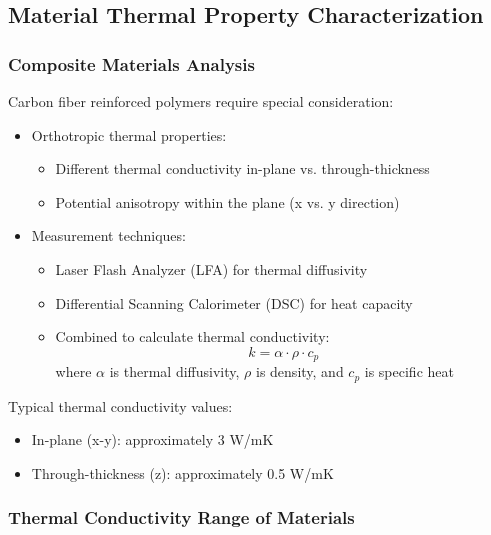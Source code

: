 \subsection*{Material Thermal Property Characterization}

\subsubsection*{Composite Materials Analysis}

Carbon fiber reinforced polymers require special consideration:
\begin{itemize}
    \item Orthotropic thermal properties:
    \begin{itemize}
        \item Different thermal conductivity in-plane vs. through-thickness
        \item Potential anisotropy within the plane (x vs. y direction)
    \end{itemize}
    \item Measurement techniques:
    \begin{itemize}
        \item Laser Flash Analyzer (LFA) for thermal diffusivity
        \item Differential Scanning Calorimeter (DSC) for heat capacity
        \item Combined to calculate thermal conductivity:
        \[
        k = \alpha \cdot \rho \cdot c_p
        \]
        where $\alpha$ is thermal diffusivity, $\rho$ is density, and $c_p$ is specific heat
    \end{itemize}
\end{itemize}

Typical thermal conductivity values:
\begin{itemize}
    \item In-plane (x-y): approximately 3 W/mK
    \item Through-thickness (z): approximately 0.5 W/mK
\end{itemize}

\subsubsection*{Thermal Conductivity Range of Materials}

